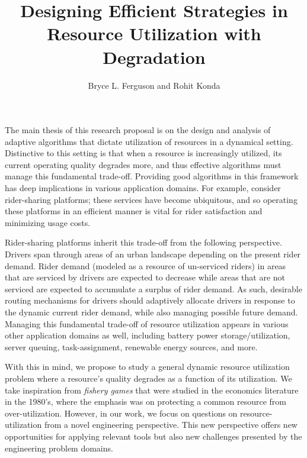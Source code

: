 \documentclass[letterpaper, 10 pt, conference]{ieeeconf}
\begin{document}
\title{Designing Efficient Strategies in Resource Utilization with Degradation}
\author{Bryce L. Ferguson and Rohit Konda}

\maketitle
\thispagestyle{empty}

The main thesis of this research proposal is on the design and analysis of adaptive algorithms that dictate utilization of resources in a dynamical setting. Distinctive to this setting is that when a resource is increasingly utilized, its current operating quality degrades more, and thus effective algorithms must manage this fundamental trade-off. Providing good algorithms in this framework has deep implications in various application domains. For example, consider rider-sharing platforms; these services have become ubiquitous, and so operating these platforms in an efficient manner is vital for rider satisfaction and minimizing usage costs. 

Rider-sharing platforms inherit this trade-off from the following perspective. Drivers span through areas of an urban landscape depending on the present rider demand. Rider demand (modeled as a resource of un-serviced riders) in areas that are serviced by drivers are expected to decrease while areas that are not serviced are expected to accumulate a surplus of rider demand. As such, desirable routing mechanisms for drivers should adaptively allocate drivers in response to the dynamic current rider demand, while also managing possible future demand. Managing this fundamental trade-off of resource utilization appears in various other application domains as well, including battery power storage/utilization, server queuing, task-assignment, renewable energy sources, and more.

With this in mind, we propose to study a general dynamic resource utilization problem where a resource's quality degrades as a function of its utilization. We take inspiration from \emph{fishery games} that were studied in the economics literature in the 1980's, where the emphasis  was on protecting a common resource from over-utilization. However, in our work, we focus on questions on resource-utilization from a novel engineering perspective. This new perspective offers new opportunities for applying relevant tools but also new challenges presented by the engineering problem domains.
\end{document}
